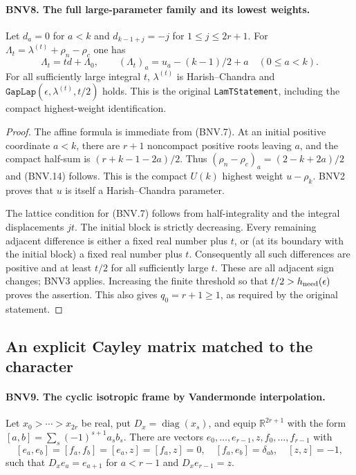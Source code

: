 \paragraph{BNV8. The full large-parameter family and its lowest weights.}
\label{claim:BNV8}
Let $d_a=0$ for $a<k$ and $d_{k-1+j}=-j$ for $1\le j\le2r+1$.
For $\Lambda_t=\lambda^{(t)}+\rho_n-\rho_c$ one has
\[
 \Lambda_t=t d+\Lambda_0,\qquad
 (\Lambda_t)_a=u_a-(k-1)/2+a\quad(0\le a<k).
 \tag{BNV.14}
\]
For all sufficiently large integral $t$, $\lambda^{(t)}$ is
Harish--Chandra and
$\texttt{GapLap}(\epsilon,\lambda^{(t)},t/2)$ holds.  This is the original
\texttt{LamTStatement}, including the compact highest-weight identification.

\begin{proof}
The affine formula is immediate from (BNV.7).  At an initial positive
coordinate $a<k$, there are $r+1$ noncompact positive roots leaving $a$,
and the compact half-sum is $(r+k-1-2a)/2$.  Thus
$(\rho_n-\rho_c)_a=(2-k+2a)/2$ and (BNV.14) follows.
This is the compact $U(k)$ highest weight $u-\rho_k$.  BNV2 proves that
$u$ is itself a Harish--Chandra parameter.

The lattice condition for (BNV.7) follows from half-integrality and the
integral displacements $jt$.  The initial block is strictly decreasing.
Every remaining adjacent difference is either a fixed real number plus
$t$, or (at its boundary with the initial block) a fixed real number plus
$t$.  Consequently all such differences are positive and at least $t/2$
for all sufficiently large $t$.  These are all adjacent sign changes;
BNV3 applies.  Increasing the finite threshold so that
$t/2>h_{\rm need}(\epsilon)$ proves the assertion.  This also gives
$q_0=r+1\ge1$, as required by the original statement.
\end{proof}

\subsection{An explicit Cayley matrix matched to the character}

\paragraph{BNV9. The cyclic isotropic frame by Vandermonde interpolation.}
\label{claim:BNV9}
Let $x_0>\cdots>x_{2r}$ be real, put
$D_x=\operatorname{diag}(x_s)$, and equip $\mathbb R^{2r+1}$ with the form
$[a,b]=\sum_s(-1)^{s+1}a_sb_s$.  There are vectors
$e_0,\ldots,e_{r-1},z,f_0,\ldots,f_{r-1}$ with
\[
 [e_a,e_b]=[f_a,f_b]=[e_a,z]=[f_a,z]=0,\quad
 [f_a,e_b]=\delta_{ab},\quad [z,z]=-1,
\]
such that $D_xe_a=e_{a+1}$ for $a<r-1$ and $D_xe_{r-1}=z$.

